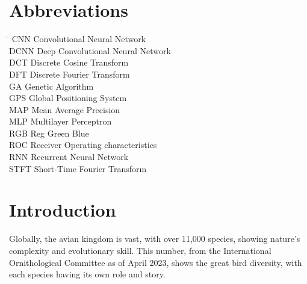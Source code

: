 \chapter*{Abbreviations}
\begin{tabbing}
    \hspace{50mm}\=\kill
    CNN \> Convolutional Neural Network\\
    DCNN \> Deep Convolutional Neural Network\\
    DCT \> Discrete Cosine Transform\\
    DFT \> Discrete Fourier Transform\\
    GA \> Genetic Algorithm\\
    GPS \> Global Positioning System\\
    MAP \> Mean Average Precision\\
    MLP \> Multilayer Perceptron\\
    RGB \> Reg Green Blue\\
    ROC \> Receiver Operating characteristics\\
    RNN \> Recurrent Neural Network\\
    STFT \> Short-Time Fourier Transform\\
\end{tabbing}
\newpage
{}


\chapter{Introduction}\label{sec}
Globally, the avian kingdom is vast, with over 11,000 species, showing nature's
complexity and evolutionary skill. This number, from the International Ornithological
Committee as of April 2023, shows the great bird diversity, with each species having 
its own role and story.\cite{ioc_updates}

